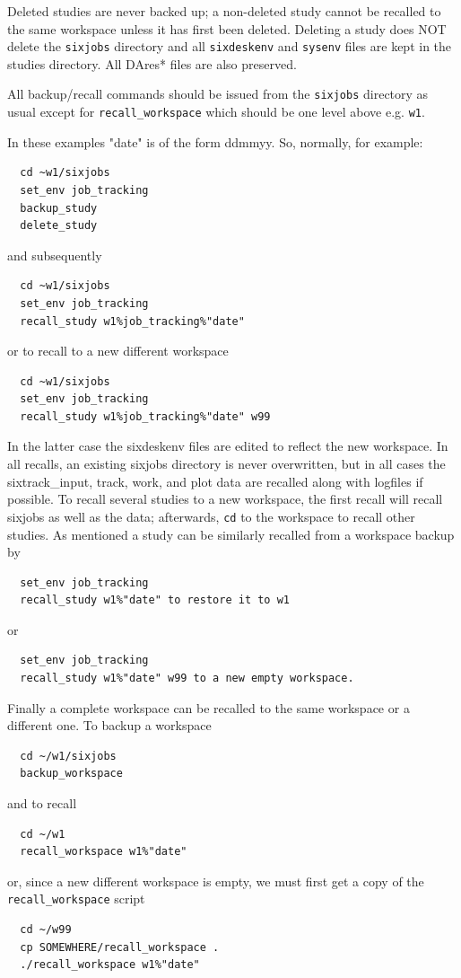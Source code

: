 \documentclass{cernatsnote}
\begin{document}
Deleted studies are never backed up; a non-deleted study cannot be recalled to
the same workspace unless it has first been deleted.  Deleting a study does NOT
delete the \texttt{sixjobs} directory and all \texttt{sixdeskenv} and \texttt{sysenv}
files are kept in the studies directory. All DAres* files
are also preserved.

All backup/recall commands should be issued from the \texttt{sixjobs} directory as
usual except for \texttt{recall\_workspace} which should be one level above e.g.
\texttt{w1}.

In these examples "date" is of the form ddmmyy.  So, normally, for example:
\begin{verbatim}
  cd ~w1/sixjobs
  set_env job_tracking
  backup_study
  delete_study
\end{verbatim}
and subsequently
\begin{verbatim}
  cd ~w1/sixjobs
  set_env job_tracking
  recall_study w1%job_tracking%"date"
\end{verbatim}
or to recall to a new different workspace
\begin{verbatim}
  cd ~w1/sixjobs
  set_env job_tracking
  recall_study w1%job_tracking%"date" w99
\end{verbatim}

In the latter case the sixdeskenv files are edited to reflect the new
workspace. In all recalls, an existing sixjobs directory is never overwritten,
but in all cases the sixtrack\_input, track, work, and plot data are recalled
along with logfiles if possible.  To recall several studies to a new workspace,
the first recall will recall sixjobs as well as the data; afterwards, \texttt{cd}
to the workspace to recall other studies.  As mentioned a study can be
similarly recalled from a workspace backup by
\begin{verbatim}
  set_env job_tracking
  recall_study w1%"date" to restore it to w1 
\end{verbatim}
or
\begin{verbatim}
  set_env job_tracking
  recall_study w1%"date" w99 to a new empty workspace.
\end{verbatim}
Finally a complete workspace can be recalled to the same workspace or a
different one.  To backup a workspace
\begin{verbatim}
  cd ~/w1/sixjobs
  backup_workspace
\end{verbatim}
and to recall
\begin{verbatim}
  cd ~/w1
  recall_workspace w1%"date"
\end{verbatim}
or, since a new different workspace is empty, we must first get a copy of the
\texttt{recall\_workspace} script
\begin{verbatim}
  cd ~/w99
  cp SOMEWHERE/recall_workspace .
  ./recall_workspace w1%"date"
\end{verbatim}
\end{document}
